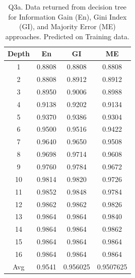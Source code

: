 \documentclass[12pt, fullpage,letterpaper]{article}
\begin{document}
\begin{table}[h]
    	\centering
    	\begin{tabular}{c|ccc}
    		Depth & En & GI & ME \\ 
    		\hline\hline
    		1 &  0.8808 & 0.8808 & 0.8808 \\ \hline
    		2 &  0.8808 & 0.8912 & 0.8912 \\ \hline
    		3 &  0.8950 & 0.9006 & 0.8988 \\ \hline
    		4 &  0.9138 & 0.9202 & 0.9134 \\ \hline
            5 &  0.9370 & 0.9386 & 0.9304 \\ \hline
            6 &  0.9500 & 0.9516 & 0.9422 \\ \hline
            7 &  0.9640 & 0.9650 & 0.9508 \\ \hline
            8 &  0.9698 & 0.9714 & 0.9608 \\ \hline
            9 &  0.9760 & 0.9784 & 0.9672 \\ \hline
            10 & 0.9814 & 0.9820 & 0.9726 \\ \hline
            11 & 0.9852 & 0.9848 & 0.9784 \\ \hline
            12 & 0.9862 & 0.9862 & 0.9826 \\ \hline
            13 & 0.9864 & 0.9864 & 0.9840 \\ \hline
            14 & 0.9864 & 0.9864 & 0.9862 \\ \hline
            15 & 0.9864 & 0.9864 & 0.9864 \\ \hline
            16 & 0.9864 & 0.9864 & 0.9864 \\ \hline
            \hline
            Avg & 0.9541 & 0.956025 & 0.9507625

    	\end{tabular}
    	\caption{Q3a. Data returned from decision tree for Information Gain (En), Gini Index (GI), and Majority Error (ME) approaches. Predicted on Training data.}
    \end{table}
    
\end{document}
